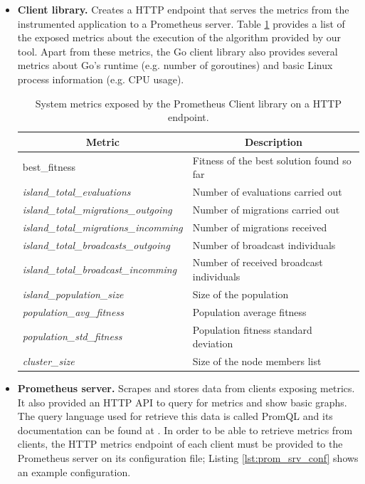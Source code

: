 \begin{itemize}
	\item \textbf{Client library.} Creates a HTTP endpoint that serves the metrics from the instrumented application to a Prometheus server. Table \ref{tab:metrics} provides a list of the exposed metrics about the execution of the algorithm provided by our tool. Apart from these metrics, the Go client library also provides several metrics about Go's runtime (e.g. number of goroutines) and basic Linux process information (e.g. CPU usage).
	
\begin{table}[h]
\begin{tabular}{|l|l|}
\hline
\multicolumn{1}{|c|}{\textbf{Metric}}         & \multicolumn{1}{c|}{\textbf{Description}}  \\ \hline
best\_fitness                                 & Fitness of the best solution found so far  \\ \hline
\textit{island\_total\_evaluations}           & Number of evaluations carried out          \\ \hline
\textit{island\_total\_migrations\_outgoing}  & Number of migrations carried out           \\ \hline
\textit{island\_total\_migrations\_incomming} & Number of migrations received              \\ \hline
\textit{island\_total\_broadcasts\_outgoing}  & Number of broadcast individuals            \\ \hline
\textit{island\_total\_broadcast\_incomming}  & Number of received broadcast individuals   \\ \hline
\textit{island\_population\_size}             & Size of the population                     \\ \hline
\textit{population\_avg\_fitness}             & Population average fitness                 \\ \hline
\textit{population\_std\_fitness}             & Population fitness standard deviation      \\ \hline
\textit{cluster\_size}                        & Size of the node members list              \\ \hline
\end{tabular}
\caption{System metrics exposed by the Prometheus Client library on a HTTP endpoint.}
\label{tab:metrics}
\end{table}
	
	\item \textbf{Prometheus server.} Scrapes and stores data from clients exposing metrics. It also provided an HTTP API to query for metrics and show basic graphs. The query language used for retrieve this data is called PromQL and its documentation can be found at \cite{promQL}. In order to be able to retrieve metrics from clients, the HTTP metrics endpoint of each client must be provided to the Prometheus server on its configuration file; Listing \ref{lst:prom_srv_conf} shows an example configuration.
	

\end{itemize}
